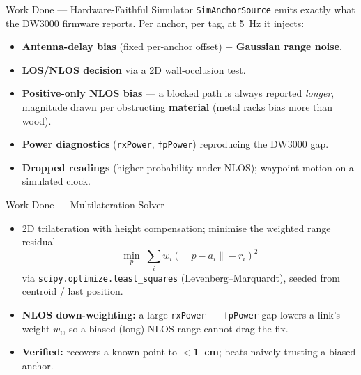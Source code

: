 \documentclass[aspectratio=169,10pt]{beamer}
\begin{document}
\begin{frame}{Work Done --- Hardware-Faithful Simulator}
  \texttt{SimAnchorSource} emits exactly what the DW3000 firmware reports. Per anchor, per tag, at 5~Hz it injects:
  \begin{itemize}
    \item \textbf{Antenna-delay bias} (fixed per-anchor offset) + \textbf{Gaussian range noise}.
    \item \textbf{LOS/NLOS decision} via a 2D wall-occlusion test.
    \item \textbf{Positive-only NLOS bias} --- a blocked path is always reported \emph{longer}, magnitude drawn
          per obstructing \textbf{material} (metal racks bias more than wood).
    \item \textbf{Power diagnostics} (\texttt{rxPower}, \texttt{fpPower}) reproducing the DW3000 gap.
    \item \textbf{Dropped readings} (higher probability under NLOS); waypoint motion on a simulated clock.
  \end{itemize}
\end{frame}

\begin{frame}{Work Done --- Multilateration Solver}
  \begin{itemize}
    \item 2D trilateration with height compensation; minimise the weighted range residual
      \[
        \min_{p}\;\sum_i w_i\left(\lVert p - a_i\rVert - r_i\right)^2
      \]
      via \texttt{scipy.optimize.least\_squares} (Levenberg--Marquardt), seeded from centroid / last position.
    \item \textbf{NLOS down-weighting:} a large \texttt{rxPower $-$ fpPower} gap lowers a link's weight $w_i$,
          so a biased (long) NLOS range cannot drag the fix.
    \item \textbf{Verified:} recovers a known point to \textbf{$<$1~cm}; beats naively trusting a biased anchor.
  \end{itemize}
\end{frame}
\end{document}
